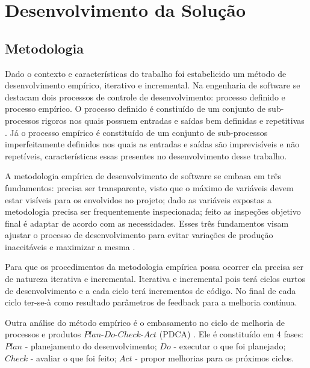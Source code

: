 \chapter{Desenvolvimento da Solução}
\label{chap:solucaocompleta}

\section{Metodologia}

Dado o contexto e características do trabalho foi estabelicido um método de desenvolvimento empírico, iterativo e incremental. Na engenharia de software se destacam dois processos de controle de desenvolvimento: processo definido e processo empírico. O processo definido é constiuído de um conjunto de sub-processos rigoros nos quais possuem entradas e saídas bem definidas e repetitivas \cite{rup}. Já o processo empírico é constituído de um conjunto de sub-processos imperfeitamente definidos nos quais as entradas e saídas são imprevisíveis e não repetíveis, características essas presentes no desenvolvimento desse trabalho.

A metodologia empírica de desenvolvimento de software se embasa em três fundamentos: precisa ser transparente, visto que o máximo de variáveis devem estar visíveis para os envolvidos no projeto; dado as variáveis expostas a metodologia precisa ser frequentemente inspecionada; feito as inspeções objetivo final é adaptar de acordo com as necessidades. Esses três fundamentos visam ajustar o processo de desenvolvimento para evitar variações de produção inaceitáveis e maximizar a mesma \cite{empirical}.

Para que os procedimentos da metodologia empírica possa ocorrer ela precisa ser de natureza iterativa e incremental. Iterativa e incremental pois terá ciclos curtos de desenvolvimento e a cada ciclo terá incrementos de código. No final de cada ciclo ter-se-à como resultado parâmetros de feedback para a melhoria contínua.

Outra análise do método empírico é o embasamento no ciclo de melhoria de processos e produtos $Plan$-$Do$-$Check$-$Act$ (PDCA) \cite{pdca}. Ele é constituído em 4 fases: $Plan$ - planejamento do desenvolvimento; $Do$ - executar o que foi planejado; $Check$ - avaliar o que foi feito; $Act$ - propor melhorias para os próximos ciclos.

